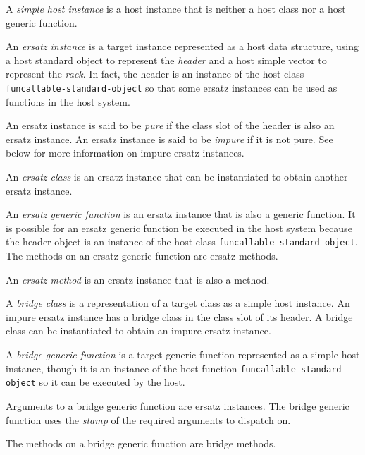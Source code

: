 \begin{definition}
A \emph{simple host instance} is a host instance that is neither a
host class nor a host generic function.
\end{definition}

\begin{definition}
An \emph{ersatz instance} is a target instance represented as a host
data structure, using a host standard object to represent the
\emph{header} and a host simple vector to represent the \emph{rack}.
In fact, the header is an instance of the host class
\texttt{funcallable-standard-object} so that some ersatz instances can
be used as functions in the host system.
\end{definition}

\begin{definition}
An ersatz instance is said to be \emph{pure} if the class slot of the
header is also an ersatz instance.  An ersatz instance is said to be
\emph{impure} if it is not pure.  See below for more information on
impure ersatz instances.
\end{definition}

\begin{definition}
An \emph{ersatz class} is an ersatz instance that can be instantiated
to obtain another ersatz instance.
\end{definition}

\begin{definition}
An \emph{ersatz generic function} is an ersatz instance that is also a
generic function.  It is possible for an ersatz generic function be
executed in the host system because the header object is an instance
of the host class \texttt{funcallable-standard-object}.  The methods
on an ersatz generic function are ersatz methods.
\end{definition}

\begin{definition}
An \emph{ersatz method} is an ersatz instance that is also a method.
\end{definition}

\begin{definition}
A \emph{bridge class} is a representation of a target class as a
simple host instance.  An impure ersatz instance has a bridge class in
the class slot of its header.  A bridge class can be instantiated to
obtain an impure ersatz instance.
\end{definition}

\begin{definition}
A \emph{bridge generic function} is a target generic function
represented as a simple host instance, though it is an instance of the
host function \texttt{funcallable-standard-object} so it can be
executed by the host.

Arguments to a bridge generic function are ersatz instances.  The
bridge generic function uses the 
\emph{stamp}
 of
the required arguments to dispatch on. 

The methods on a bridge generic function are bridge methods.
\end{definition}


